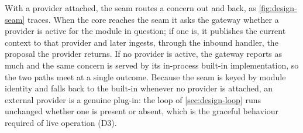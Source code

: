 With a provider attached, the seam routes a concern out and back, as \cref{fig:design-seam} traces.
When the core reaches the seam it asks the gateway whether a provider is active for the module in question; if one is, it publishes the current context to that provider and later ingests, through the inbound handler, the proposal the provider returns.
If no provider is active, the gateway reports as much and the same concern is served by its in-process built-in implementation, so the two paths meet at a single outcome.
Because the seam is keyed by module identity and falls back to the built-in whenever no provider is attached, an external provider is a genuine plug-in: the loop of \cref{sec:design-loop} runs unchanged whether one is present or absent, which is the graceful behaviour required of live operation (D3).

